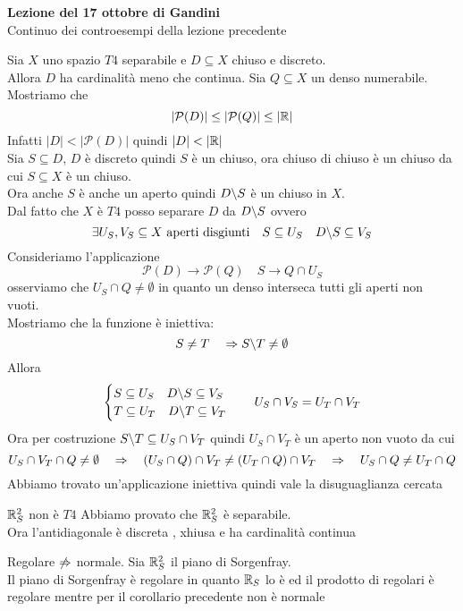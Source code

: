 

\textbf{Lezione del 17 ottobre di Gandini}\\
Continuo dei controesempi della lezione precedente
\begin{lem}Sia $X$ uno spazio $T4$ separabile e $D\subseteq X$ chiuso e discreto.\\
Allora $D$ ha cardinalit\`a meno che continua.
\proof Sia $Q\subseteq X $ un denso numerabile.\\
Mostriamo che 
$$ \vert \mathcal{P}(D) \vert \leq \vert \mathcal{P}(Q) \vert \leq \vert \mathbb{R}\vert$$
Infatti $\vert D \vert < \vert \mathcal{P}(D) \vert$ quindi $ \vert D  \vert < \vert \mathbb{R} \vert $\\

Sia $S \subseteq D$, $D$  \`e discreto quindi  $S$ \`e  un chiuso, ora chiuso di chiuso \`e un chiuso da cui $S\subseteq X $ \`e un chiuso.\\
Ora anche $S$ \`e anche un aperto quindi $D\backslash S $ \`e un chiuso in $X$.\\
Dal fatto che $X$ \`e $T4$ posso separare $D$ da $D \backslash S$ ovvero 
$$ \exists U_S, V_S\subseteq X \text{ aperti disgiunti} \quad S \subseteq U_S \quad D\backslash S \subseteq V_S$$
Consideriamo l'applicazione   
$$\mathcal{P}(D) \to \mathcal{P}(Q) \quad S \to Q \cap U_S$$
osserviamo che  $U_S \cap Q \neq \emptyset$ in quanto un denso interseca tutti gli aperti non vuoti.\\
Mostriamo che la funzione \`e iniettiva:
$$ S\neq T \quad \Rightarrow S\backslash T \neq \emptyset $$
Allora
$$ \begin{cases} S \subseteq U_S \quad D \backslash S \subseteq V_S\\
T \subseteq U_T \quad D \backslash T \subseteq V_T 
\end{cases} \quad U_S \cap V_S = U_T \cap V_T$$
Ora per costruzione $S\backslash T \subseteq U_S \cap V_T$ quindi $U_S \cap V_T$ \`e un aperto non vuoto da cui 
$$ U_S \cap V_T \cap Q \neq \emptyset \quad \Rightarrow \quad (U_S \cap Q ) \cap V_T \neq (U_T \cap Q ) \cap V_T \quad \Rightarrow \quad U_S \cap Q \neq U_T \cap Q$$
Abbiamo trovato un'applicazione iniettiva quindi vale la disuguaglianza cercata
\endproof
\end{lem}
\begin{cor}$\mathbb{R}_S^2$ non \`e $T4$ 
\proof Abbiamo provato che $\mathbb{R}_S^2$ \`e separabile.\\
Ora l'antidiagonale \`e discreta , xhiusa e ha cardinalit\`a continua
\end{cor}
\begin{oss}
\item Regolare $\not \Rightarrow$ normale. Sia $\mathbb{R}_S^2$ il piano di Sorgenfray.\\
Il piano di Sorgenfray \`e regolare in quanto $\mathbb{R}_S$ lo \`e ed il prodotto di regolari \`e regolare mentre per il corollario precedente non \`e normale
\end{oss}
